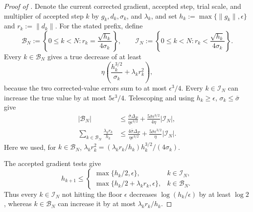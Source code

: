 \documentclass{article}
\begin{document}
\begin{proof}[Proof of ]
Denote the current corrected gradient, accepted step, trial scale, and
multiplier of accepted step $k$ by $g_k,d_k,\sigma_k$, and
$\lambda_k$, and set
$h_k:=\max\{\|g_k\|,\epsilon\}$ and $r_k:=\|d_k\|$.  For the stated
prefix, define
\[
 \mathcal B_N:=\left\{0\le k<N:
   r_k=\frac{\sqrt{h_k}}{4\sigma_k}\right\},
 \qquad
 \mathcal I_N:=\left\{0\le k<N:
   r_k<\frac{\sqrt{h_k}}{4\sigma_k}\right\}.
\]
Every $k\in\mathcal B_N$ gives a true decrease of at least
\[
 \eta\left(\frac{h_k^{3/2}}{\sigma_k}
       +\lambda_kr_k^2\right),
\]
because the two corrected-value errors sum to at most
$\epsilon^3/4$.  Every $k\in\mathcal I_N$ can increase the true
value by at most $5\epsilon^3/4$.  Telescoping and using
$h_k\ge\epsilon$, $\sigma_k\le\bar\sigma$ give
\begin{subequations}\label{eq:pf-boundary-budgets}
\begin{align}
 |\mathcal B_N|
 &\le\frac{\bar\sigma\Delta_P}
          {\eta\epsilon^{3/2}}
 +\frac{5\bar\sigma\epsilon^{3/2}}{4\eta}|\mathcal I_N|,
       \label{eq:pf-boundary-count}\\
 \sum_{k\in\mathcal B_N}\frac{\lambda_kr_k}{h_k}
 &\le\frac{4\bar\sigma\Delta_P}
          {\eta\epsilon^{3/2}}
 +\frac{5\bar\sigma\epsilon^{3/2}}{\eta}|\mathcal I_N|.
       \label{eq:pf-multiplier-budget}
\end{align}
\end{subequations}
Here we used, for $k\in\mathcal B_N$,
$\lambda_kr_k^2=(\lambda_kr_k/h_k)h_k^{3/2}/(4\sigma_k)$.

The accepted gradient tests give
\[
 h_{k+1}\le
 \begin{cases}
  \max\{h_k/2,\epsilon\},&k\in\mathcal I_N,\\
  \max\{h_k/2+\lambda_kr_k,\epsilon\},&k\in\mathcal B_N.
 \end{cases}
\]
Thus every $k\in\mathcal I_N$ not hitting the floor $\epsilon$
decreases $\log(h_k/\epsilon)$ by at least $\log2$, whereas
$k\in\mathcal B_N$ can
increase it by at most $\lambda_kr_k/h_k$.


\end{proof}
\end{document}
